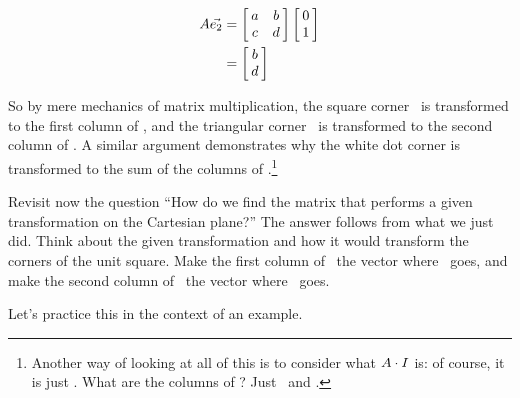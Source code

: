 \begin{align*}
\tta\vetwo &= \bmx{cc}a&b\\c&d\emx\bmx{c}0\\1\emx \\
					&= \bmx{c}b\\d\emx
\end{align*}

So by mere mechanics of matrix multiplication, the square corner \veone\ is transformed to the first column of \tta, and the triangular corner \vetwo\ is transformed to the second column of \tta. A similar argument demonstrates why the white dot corner is transformed to the sum of the columns of \tta.\footnote{Another way of looking at all of this is to consider what $\tta\cdot\tti$ is: of course, it is just \tta. What are the columns of \tti? Just \veone\ and \vetwo.}

Revisit now the question ``How do we find the matrix that performs a given transformation on the Cartesian plane?'' The answer follows from what we just did. Think about the given transformation and how it would transform the corners of the unit square. Make the first column of \tta\ the vector where \veone\ goes, and make the second column of \tta\ the vector where \vetwo\ goes.

Let's practice this in the context of an example.\\


